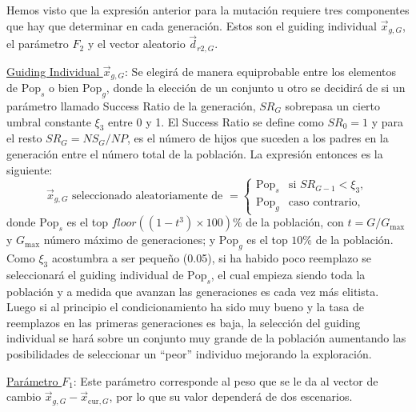 \documentclass{article}
\begin{document}
Hemos visto que la expresión anterior para la mutación requiere tres componentes que hay que determinar en cada generación. Estos son el guiding individual $\vec{x}_{g,G}$, el parámetro $F_{2}$ y el vector aleatorio $\vec{d}_{r2,G}$.\vspace{1cm}

\underline{Guiding Individual $\vec{x}_{g,G}$}: Se elegirá de manera equiprobable entre los elementos de $\text{Pop}_{s}$ o bien $\text{Pop}_{g}$, donde la elección de un conjunto u otro se decidirá de si un parámetro llamado Success Ratio de la generación, $SR_{G}$ sobrepasa un cierto umbral constante $\xi_{3}$ entre 0 y 1. El Success Ratio se define como $SR_{0}=1$ y para el resto $SR_{G}=NS_{G}/NP$, es el número de hijos que suceden a los padres en la generación entre el número total de la población. La expresión entonces es la siguiente:
\begin{equation}
    \vec{x}_{g,G} \text{ seleccionado aleatoriamente de } = \left\{\begin{array}{ll}
            \text{Pop}_{s} & \text{si }SR_{G-1}<\xi_3,\\
            \text{Pop}_{g} & \text{caso contrario},
    \end{array}\right.
\label{guiding}
\end{equation}
donde $\text{Pop}_{s}$ es el top $floor((1-t^{3})\times 100)\%$ de la población, con $t=G/G_{\max}$ y $G_{\max}$ número máximo de generaciones; y $\text{Pop}_{g}$ es el top $10\%$ de la población. Como $\xi_{3}$ acostumbra a ser pequeño (0.05), si ha habido poco reemplazo se seleccionará el guiding individual de $\text{Pop}_{s}$, el cual empieza siendo toda la población y a medida que avanzan las generaciones es cada vez más elitista. Luego si al principio el condicionamiento ha sido muy bueno y la tasa de reemplazos en las primeras generaciones es baja, la selección del guiding individual se hará sobre un conjunto muy grande de la población aumentando las posibilidades de seleccionar un ``peor'' individuo mejorando la exploración.\vspace{1cm}

\underline{Parámetro $F_{1}$}: Este parámetro corresponde al peso que se le da al vector de cambio $\vec{x}_{g,G}-\vec{x}_{\text{cur}, G}$, por lo que su valor dependerá de dos escenarios.
\end{document}
